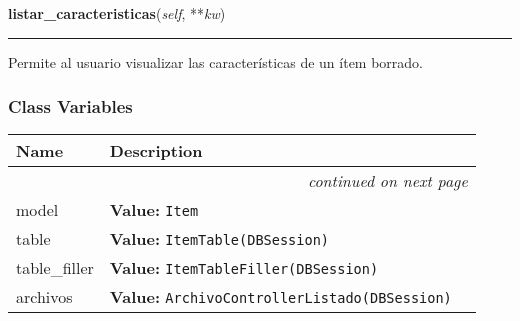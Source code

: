     \vspace{0.5ex}

\hspace{.8\funcindent}\begin{boxedminipage}{\funcwidth}

    \raggedright \textbf{listar\_caracteristicas}(\textit{self}, **\textit{kw})

    \vspace{-1.5ex}

    \rule{\textwidth}{0.5\fboxrule}
\setlength{\parskip}{2ex}
    Permite al usuario visualizar las características de un ítem borrado.

\setlength{\parskip}{1ex}
    \end{boxedminipage}



  \subsubsection{Class Variables}

    \vspace{-1cm}
\hspace{\varindent}\begin{longtable}{|p{\varnamewidth}|p{\vardescrwidth}|l}
\cline{1-2}
\cline{1-2} \centering \textbf{Name} & \centering \textbf{Description}& \\
\cline{1-2}
\endhead\cline{1-2}\multicolumn{3}{r}{\small\textit{continued on next page}}\\\endfoot\cline{1-2}
\endlastfoot\raggedright m\-o\-d\-e\-l\- & \raggedright \textbf{Value:} 
{\tt Item}&\\
\cline{1-2}
\raggedright t\-a\-b\-l\-e\- & \raggedright \textbf{Value:} 
{\tt ItemTable(DBSession)}&\\
\cline{1-2}
\raggedright t\-a\-b\-l\-e\-\_\-f\-i\-l\-l\-e\-r\- & \raggedright \textbf{Value:} 
{\tt ItemTableFiller(DBSession)}&\\
\cline{1-2}
\raggedright a\-r\-c\-h\-i\-v\-o\-s\- & \raggedright \textbf{Value:} 
{\tt ArchivoControllerListado(DBSession)}&\\
\cline{1-2}
\end{longtable}

